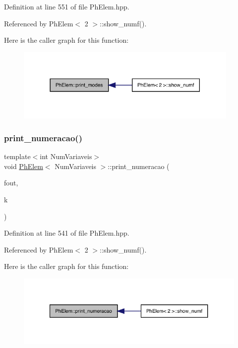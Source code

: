 Definition at line 551 of file Ph\+Elem.\+hpp.



Referenced by Ph\+Elem$<$ 2 $>$\+::show\+\_\+numf().

Here is the caller graph for this function\+:
\nopagebreak
\begin{figure}[H]
\begin{center}
\leavevmode
\includegraphics[width=306pt]{classPhElem_ae7659320b2118608e38d192443bb2b8f_icgraph}
\end{center}
\end{figure}
\mbox{\label{classPhElem_a8d2c46990cba5a5459198d883b763eab}} 
\subsubsection{\texorpdfstring{print\+\_\+numeracao()}{print\_numeracao()}}
{\footnotesize\ttfamily template$<$int Num\+Variaveis$>$ \\
void \hyperlink{classPhElem}{Ph\+Elem}$<$ Num\+Variaveis $>$\+::print\+\_\+numeracao (\begin{DoxyParamCaption}\item[{F\+I\+LE $\ast$}]{fout,  }\item[{const int \&}]{k }\end{DoxyParamCaption})}



Definition at line 541 of file Ph\+Elem.\+hpp.



Referenced by Ph\+Elem$<$ 2 $>$\+::show\+\_\+numf().

Here is the caller graph for this function\+:
\nopagebreak
\begin{figure}[H]
\begin{center}
\leavevmode
\includegraphics[width=321pt]{classPhElem_a8d2c46990cba5a5459198d883b763eab_icgraph}
\end{center}
\end{figure}
\mbox{\label{classPhElem_a53eb1654e889d3fc893f50dcea12adcb}} 
